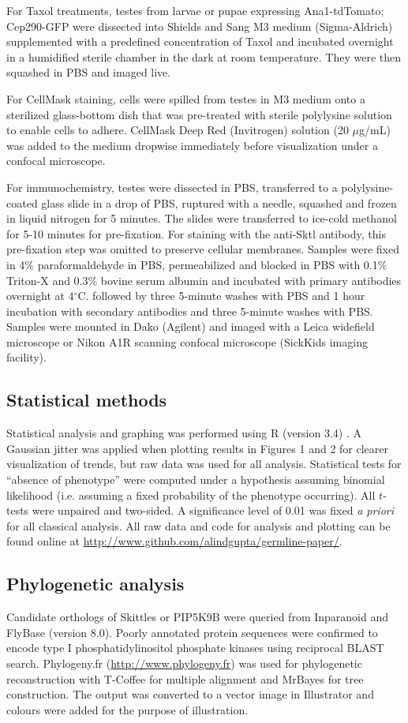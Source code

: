 \documentclass[12pt, twoside, letterpaper]{article}
\begin{document}
For Taxol treatments, testes from larvae or pupae expressing
Ana1-tdTomato; Cep290-GFP were
dissected into Shields and Sang M3 medium (Sigma-Aldrich) supplemented
with a predefined
concentration of Taxol and incubated overnight in a humidified sterile
chamber in the dark at room temperature. They were then squashed
in PBS and imaged live.

For CellMask staining, cells were spilled from testes in M3 medium onto
a sterilized glass-bottom dish that was pre-treated with sterile polylysine solution
to enable cells to adhere.
CellMask Deep Red (Invitrogen) solution (20 $\mu$g/mL) was added to the medium dropwise
immediately before visualization under a confocal microscope.

For immunochemistry, testes were dissected in PBS,
transferred to a polylysine-coated glass slide in a drop of PBS,
ruptured with a needle, squashed and frozen in liquid nitrogen for 5 minutes.
The slides were transferred to ice-cold methanol for 5-10 minutes for pre-fixation.
For staining with the anti-Sktl antibody, this pre-fixation step
was omitted to preserve cellular membranes.
Samples were fixed in 4\% paraformaldehyde in PBS,
permeabilized and blocked in PBS with 0.1\% Triton-X and 0.3\% bovine
serum albumin and incubated with primary antibodies overnight at 4$^{\circ}$C.
followed by three 5-minute washes with PBS and 1 hour incubation
with secondary antibodies and three 5-minute washes with PBS.
Samples were mounted in Dako (Agilent) and imaged with
a Leica widefield microscope
or Nikon A1R scanning confocal microscope (SickKids imaging facility).

\subsection{Statistical methods}
Statistical analysis and graphing was performed using R (version 3.4)
\citep{r}.
A Gaussian jitter was applied when plotting
results in Figures 1 and 2 for clearer visualization of trends,
but raw data was used for all analysis.
Statistical tests for ``absence of phenotype'' were computed under a
hypothesis assuming binomial likelihood (i.e. assuming a fixed probability of the
phenotype occurring).
All $t$-tests were unpaired and two-sided.
A significance level of 0.01 was fixed \textit{a priori} for all classical analysis.
All raw data and code for analysis and plotting can be found online
at \url{http://www.github.com/alindgupta/germline-paper/}.

\subsection{Phylogenetic analysis}
Candidate orthologs of Skittles or PIP5K9B were queried
from Inparanoid and FlyBase (version 8.0).
Poorly annotated protein sequences were confirmed
to encode type I phosphatidylinositol phosphate
kinases using reciprocal BLAST search.
Phylogeny.fr (\url{http://www.phylogeny.fr}) was used for
phylogenetic reconstruction with T-Coffee for multiple alignment
and MrBayes for tree construction.
The output was converted to a vector image in Illustrator
and colours were added for the purpose of illustration.
\end{document}
